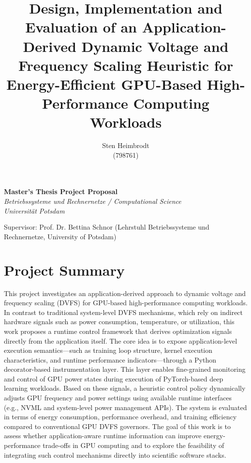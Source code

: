 \documentclass[12pt]{article}
\begin{document}
\title{{\bf Design, Implementation and Evaluation of an Application-Derived Dynamic Voltage and Frequency Scaling Heuristic for Energy-Efficient GPU-Based High-Performance Computing Workloads}}

\author{Sten Heimbrodt \\ (798761)}

\maketitle
\thispagestyle{titlepage}

\bigskip
\begin{center}
\textbf{Master's Thesis Project Proposal}\\
\emph{Betriebssysteme und Rechnernetze / Computational Science\\
 Universität Potsdam}
\end{center}

\vfill
\begin{flushleft}

Supervisor: Prof. Dr. Bettina Schnor (Lehrstuhl Betriebssysteme und Rechnernetze, University of Potsdam) \\
\bigskip
\end{flushleft}

\begin{flushright}

\Large\bf

\end{flushright}


\newpage

\section*{Project Summary}

This project investigates an application-derived approach to dynamic voltage and frequency scaling (DVFS) for GPU-based high-performance computing workloads. In contrast to traditional system-level DVFS mechanisms, which rely on indirect hardware signals such as power consumption, temperature, or utilization, this work proposes a runtime control framework that derives optimization signals directly from the application itself. The core idea is to expose application-level execution semantics—such as training loop structure, kernel execution characteristics, and runtime performance indicators—through a Python decorator-based instrumentation layer. This layer enables fine-grained monitoring and control of GPU power states during execution of PyTorch-based deep learning workloads. Based on these signals, a heuristic control policy dynamically adjusts GPU frequency and power settings using available runtime interfaces (e.g., NVML and system-level power management APIs). The system is evaluated in terms of energy consumption, performance overhead, and training efficiency compared to conventional GPU DVFS governors. The goal of this work is to assess whether application-aware runtime information can improve energy-performance trade-offs in GPU computing and to explore the feasibility of integrating such control mechanisms directly into scientific software stacks.
\newpage
\end{document}
